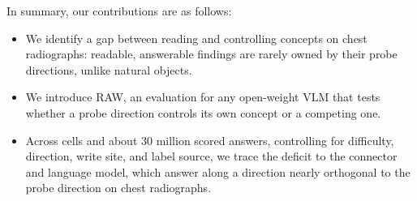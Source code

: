 In summary, our contributions are as follows:
\begin{itemize}[leftmargin=*,nosep]
\item We identify a gap between reading and controlling concepts on chest radiographs: readable, answerable findings are rarely owned by their probe directions, unlike natural objects.
\item We introduce RAW, an evaluation for any open-weight VLM that tests whether a probe direction controls its own concept or a competing one.
\item Across \cfCells{} cells and about 30 million scored answers, controlling for difficulty, direction, write site, and label source, we trace the deficit to the connector and language model, which answer along a direction nearly orthogonal to the probe direction on chest radiographs.
\end{itemize}
